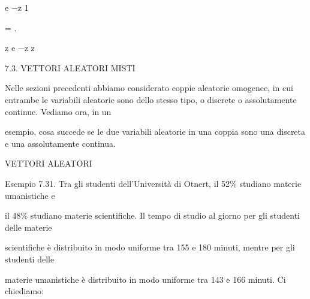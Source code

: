\documentclass[a4paper,portrait,12pt]{article}
\begin{document}
\begin{flushleft}
e $-$z 1
\end{flushleft}


= .


\begin{flushleft}
z e $-$z z
\end{flushleft}





\begin{flushleft}
7.3. VETTORI ALEATORI MISTI
\end{flushleft}


\begin{flushleft}
Nelle sezioni precedenti abbiamo considerato coppie aleatorie omogenee, in cui entrambe le variabili aleatorie sono dello stesso tipo, o discrete o assolutamente continue. Vediamo ora, in un
\end{flushleft}


\begin{flushleft}
esempio, cosa succede se le due variabili aleatorie in una coppia sono una discreta e una assolutamente continua.
\end{flushleft}










\begin{flushleft}
VETTORI ALEATORI
\end{flushleft}





\begin{flushleft}
Esempio 7.31. Tra gli studenti dell'Universit\`{a} di Otnert, il 52\% studiano materie umanistiche e
\end{flushleft}


\begin{flushleft}
il 48\% studiano materie scientifiche. Il tempo di studio al giorno per gli studenti delle materie
\end{flushleft}


\begin{flushleft}
scientifiche \`{e} distribuito in modo uniforme tra 155 e 180 minuti, mentre per gli studenti delle
\end{flushleft}


\begin{flushleft}
materie umanistiche \`{e} distribuito in modo uniforme tra 143 e 166 minuti. Ci chiediamo:
\end{flushleft}
\end{document}
